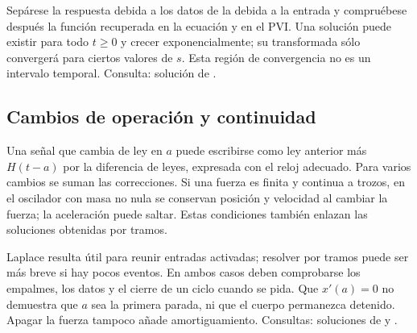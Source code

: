 Sepárese la respuesta debida a los datos de la debida a la entrada y
compruébese después la función recuperada en la ecuación y en el PVI.
Una solución puede existir para todo $t\ge0$ y crecer exponencialmente;
su transformada sólo convergerá para ciertos valores de $s$. Esta región
de convergencia no es un intervalo temporal. Consulta: solución de
.

%
\subsection*{Cambios de operación y continuidad}
\label{CH06-B04}
Una señal que cambia de ley en $a$ puede escribirse como ley anterior
más $H(t-a)$ por la diferencia de leyes, expresada con el reloj adecuado.
Para varios cambios se suman las correcciones. Si una fuerza es finita
y continua a trozos, en el oscilador con masa no nula se conservan
posición y velocidad al cambiar la fuerza; la aceleración puede saltar.
Estas condiciones también enlazan las soluciones obtenidas por tramos.

Laplace resulta útil para reunir entradas activadas; resolver por tramos
puede ser más breve si hay pocos eventos. En ambos casos deben
comprobarse los empalmes, los datos y el cierre de un ciclo cuando se
pida. Que $x'(a)=0$ no demuestra que $a$ sea la primera parada, ni que
el cuerpo permanezca detenido. Apagar la fuerza tampoco añade
amortiguamiento. Consultas: soluciones de  y
.
